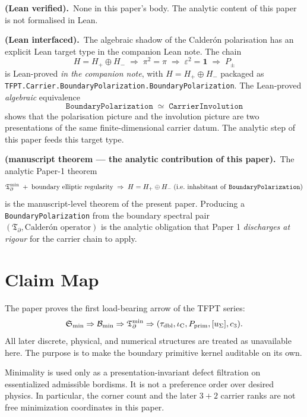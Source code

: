 \documentclass[11pt,a4paper]{article}
\begin{document}
\begin{tfptstatusbox}
\textbf{ (Lean verified).}\ None in this paper's
body. The analytic content of this paper is not formalised
in Lean.

\smallskip\noindent
\textbf{ (Lean interfaced).}\ The algebraic shadow of
the Calder\'on polarisation has an explicit Lean target type
in the companion Lean note. The chain
\[
H = H_+ \oplus H_-
\;\Rightarrow\;
\pi^2 = \pi
\;\Rightarrow\;
\varepsilon^2 = \mathbf 1
\;\Rightarrow\;
P_\pm
\]
is Lean-proved  \emph{in the companion note},
with $H = H_+ \oplus H_-$ packaged as
\texttt{TFPT.Carrier.BoundaryPolarization.BoundaryPolarization}.
The Lean-proved \emph{algebraic} equivalence
\[
\texttt{BoundaryPolarization}
\;\;\simeq\;\;
\texttt{CarrierInvolution}
\]
shows that the polarisation picture and the involution picture
are two presentations of the same finite-dimensional carrier
datum. The analytic step of this paper feeds this target type.

\smallskip\noindent
\textbf{ (manuscript theorem --- the analytic
contribution of this paper).}\ The analytic Paper-1 theorem
\[
\mathfrak T_{\partial}^{\min}
\;+\;
\text{boundary elliptic regularity}
\;\Rightarrow\;
H = H_+ \oplus H_-
\;\text{(i.e.\ inhabitant of \texttt{BoundaryPolarization})}
\]
is the manuscript-level theorem of the present paper.
Producing a \texttt{BoundaryPolarization} from the boundary
spectral pair $(\mathfrak T_\partial, \text{Calder\'on
operator})$ is the analytic obligation that Paper 1
\emph{discharges at  rigour} for the carrier chain
to apply.
\end{tfptstatusbox}

\tableofcontents

\section{Claim Map}

The paper proves the first load-bearing arrow of the TFPT series:
\[
\mathfrak S_{\min}
\Rightarrow
\mathcal B_{\min}
\Rightarrow
\mathfrak T_{\partial}^{\min}
\Rightarrow
(\tau_{\mathrm{dbl}},\iota_{\mathrm C},P_{\mathrm{prim}},[u_\Sigma],c_3).
\]
All later discrete, physical, and numerical structures are treated as unavailable here. The purpose
is to make the boundary primitive kernel auditable on its own.

\begin{tfptwarningbox}
Minimality is used only as a presentation-invariant defect filtration on essentialized admissible
bordisms. It is not a preference order over desired physics. In particular, the corner count and
the later $3+2$ carrier ranks are not free minimization coordinates in this paper.
\end{tfptwarningbox}
\end{document}

